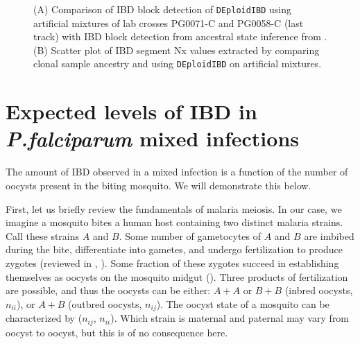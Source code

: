 \documentclass[9pt]{article}
\begin{document}
\begin{figure}[ht]
  \centering{}
  \caption{(A) Comparison of IBD block detection of {\tt DEploidIBD} using artificial mixtures of lab crosses PG0071-C and PG0058-C (last track) with IBD block detection from ancestral state inference from \citet{Li2003}. (B) Scatter plot of IBD segment Nx values extracted by comparing clonal sample ancestry and using {\tt DEploidIBD} on artificial mixtures.}\label{fig:bgibd}
\end{figure}

\newpage
\FloatBarrier
\section{Expected levels of IBD in \textit{ P.falciparum } mixed infections}

The amount of IBD observed in a mixed infection is a function of the number of oocysts present in the biting mosquito. We will demonstrate this below.

First, let us briefly review the fundamentals of malaria meiosis. In our case, we imagine a mosquito bites a human host containing two distinct malaria strains. Call these strains $A$ and $B$. Some number of gametocytes of $A$ and $B$ are imbibed during the bite, differentiate into gametes, and undergo fertilization to produce zygotes (reviewed in \citet{Gosh2000}, \citet{Bennink2016}). Some fraction of these zygotes succeed in establishing themselves as oocysts on the mosquito midgut (\citet{Gosh2000}). Three products of fertilization are possible, and thus the oocysts can be either: $A+A$ or $B+B$ (inbred oocysts, $n_{ii}$), or $A+B$ (outbred oocysts, $n_{ij}$). The oocyst state of a mosquito can be characterized by ($n_{ij}$, $n_{ii}$). Which strain is maternal and paternal may vary from oocyst to oocyst, but this is of no consequence here.
\end{document}
